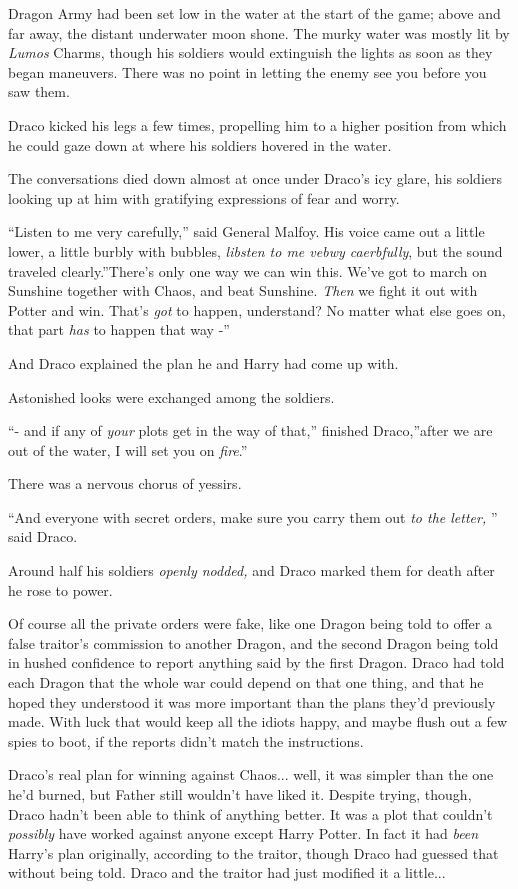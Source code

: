 Dragon Army had been set low in the water at the start of the game;
above and far away, the distant underwater moon shone. The murky water
was mostly lit by \emph{Lumos} Charms, though his soldiers would
extinguish the lights as soon as they began maneuvers. There was no
point in letting the enemy see you before you saw them.

Draco kicked his legs a few times, propelling him to a higher position
from which he could gaze down at where his soldiers hovered in the
water.

The conversations died down almost at once under Draco's icy glare, his
soldiers looking up at him with gratifying expressions of fear and
worry.

``Listen to me very carefully,'' said General Malfoy. His voice came out
a little lower, a little burbly with bubbles, \emph{libsten to me vebwy
caerbfully}, but the sound traveled clearly.''There's only one way we
can win this. We've got to march on Sunshine together with Chaos, and
beat Sunshine. \emph{Then} we fight it out with Potter and win. That's
\emph{got} to happen, understand? No matter what else goes on, that part
\emph{has} to happen that way -''

And Draco explained the plan he and Harry had come up with.

Astonished looks were exchanged among the soldiers.

``- and if any of \emph{your} plots get in the way of that,'' finished
Draco,''after we are out of the water, I will set you on \emph{fire}.''

There was a nervous chorus of yessirs.

``And everyone with secret orders, make sure you carry them out \emph{to
the letter,} '' said Draco.

Around half his soldiers \emph{openly nodded,} and Draco marked them for
death after he rose to power.

Of course all the private orders were fake, like one Dragon being told
to offer a false traitor's commission to another Dragon, and the second
Dragon being told in hushed confidence to report anything said by the
first Dragon. Draco had told each Dragon that the whole war could depend
on that one thing, and that he hoped they understood it was more
important than the plans they'd previously made. With luck that would
keep all the idiots happy, and maybe flush out a few spies to boot, if
the reports didn't match the instructions.

Draco's real plan for winning against Chaos... well, it was simpler
than the one he'd burned, but Father still wouldn't have liked it.
Despite trying, though, Draco hadn't been able to think of anything
better. It was a plot that couldn't \emph{possibly} have worked against
anyone except Harry Potter. In fact it had \emph{been} Harry's plan
originally, according to the traitor, though Draco had guessed that
without being told. Draco and the traitor had just modified it a
little...

